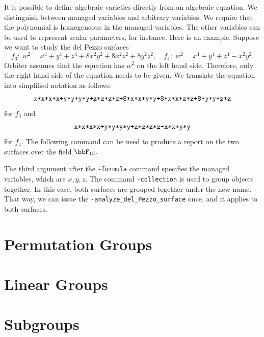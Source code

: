 It is possible to define algebraic varieties directly from an algebraic equation. 
We distinguish between managed variables and arbitrary variables.
We require that the polynomial is homogeneous in the managed variables. 
The other variables can be used to represent scalar parameters, for instance.
Here is an example. Suppose we want to study the del Pezzo surfaces 
$$
f_3: \; w^2 = x^4+y^4+z^4+8x^2y^2+8x^2z^2+8y^2z^2, \quad f_4 :\; w^2 = x^4+y^4+z^4-x^2y^2.
$$
Orbiter assumes that the equation has $w^2$ on the left hand side. 
Therefore, only the right hand side of the equation needs to be given.
We translate the equation into simplified notation as follows:
$$
\verb'x*x*x*x+y*y*y*y+z*z*z*z+8*x*x*y*y+8*x*x*z*z+8*y*y*z*z'
$$
for $f_3$ and 
$$
\verb'x*x*x*x+y*y*y*y+z*z*z*z-x*x*y*y'
$$
for $f_4$.
The following command can be used to produce 
a report on the two surfaces over the field $\bbF_{13}.$
{\tt

}
The third argument after the \verb'-formula' command specifies the managed variables, which are $x,y,z.$
The command \verb'-collection' is used to group objects together. In this case, both surfaces 
are grouped together under the new name. 
That way, we can issue the \verb'-analyze_del_Pezzo_surface' once, and it applies to both surfaces. 




\section{Permutation Groups}
\label{sec:permutation:groups}



\bigskip





\clearpage




\section{Linear Groups}
\label{sec:lineargroups}



\bigskip


\clearpage

\section{Subgroups}
\label{sec:subgroups}

